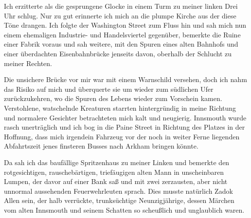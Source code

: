 Ich erzitterte als die gesprungene Glocke in einem Turm zu meiner linken Drei Uhr schlug. Nur zu gut erinnerte ich mich an die plumpe Kirche aus der diese Töne drangen. Ich folgte der Washington Street zum Fluss hin und sah mich nun einem ehemaligen Industrie- und Handelsviertel gegenüber, bemerkte die Ruine einer Fabrik voraus und sah weitere, mit den Spuren eines alten Bahnhofs und einer überdachten Eisenbahnbrücke jenseits davon, oberhalb der Schlucht zu meiner Rechten.

Die unsichere Brücke vor mir war mit einem Warnschild versehen, doch ich nahm das Risiko auf mich und überquerte sie um wieder zum südlichen Ufer zurückzukehren, wo die Spuren des Lebens wieder zum Vorschein kamen. Verstohlene, watschelnde Kreaturen starrten hintergründig in meine Richtung und normalere Gesichter betrachteten mich kalt und neugierig. Innsmouth wurde rasch unerträglich und ich bog in die Paine Street in Richtung des Platzes in der Hoffnung, dass mich irgendein Fahrzeug vor der noch in weiter Ferne liegenden Abfahrtszeit jenes finsteren Busses nach Arkham bringen könnte.

Da sah ich das baufällige Spritzenhaus zu meiner Linken und bemerkte den rotgesichtigen, rauschebärtigen, triefäugigen alten Mann in unscheinbaren Lumpen, der davor auf einer Bank saß und mit zwei zerzausten, aber nicht unnormal aussehenden Feuerwehrleuten sprach. Dies musste natürlich Zadok Allen sein, der halb verrückte, trunksüchtige Neunzigjährige, dessen Märchen vom alten Innsmouth und seinem Schatten so scheußlich und unglaublich waren.
